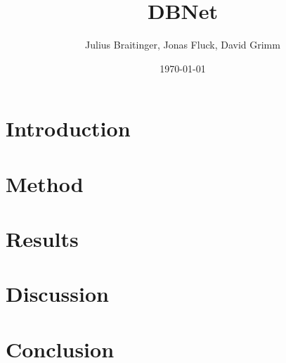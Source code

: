 \documentclass{article}
\title{DBNet}
\author{Julius Braitinger, Jonas Fluck, David Grimm}
\date{\today}
\begin{document}
\maketitle

\begin{abstract}
\end{abstract}

\section{Introduction}

\section{Method}

\section{Results}

\section{Discussion}

\section{Conclusion}

\begin{thebibliography}{9}
\end{thebibliography}
\end{document}
